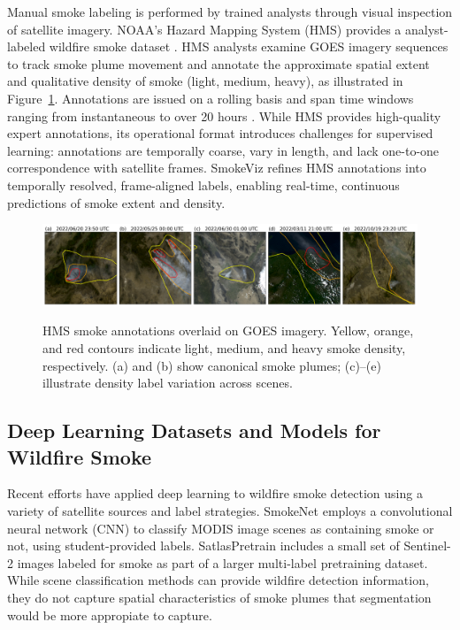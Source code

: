 \documentclass{article}
\begin{document}
Manual smoke labeling is performed by trained analysts through visual inspection of satellite imagery. NOAA’s Hazard Mapping System (HMS) provides a analyst-labeled wildfire smoke dataset \cite{hms, hms_val}. HMS analysts examine GOES imagery sequences to track smoke plume movement and annotate the approximate spatial extent and qualitative density of smoke (light, medium, heavy), as illustrated in Figure~\ref{densities}. Annotations are issued on a rolling basis and span time windows ranging from instantaneous to over 20 hours \cite{hms_web}. While HMS provides high-quality expert annotations, its operational format introduces challenges for supervised learning: annotations are temporally coarse, vary in length, and lack one-to-one correspondence with satellite frames. SmokeViz refines HMS annotations into temporally resolved, frame-aligned labels, enabling real-time, continuous predictions of smoke extent and density.

\begin{figure}[!htb]
    \centering
    \includegraphics[width=\linewidth]{figures/variations_small.png}\label{densities}
    \caption{HMS smoke annotations overlaid on GOES imagery. Yellow, orange, and red contours indicate light, medium, and heavy smoke density, respectively. (a) and (b) show canonical smoke plumes; (c)–(e) illustrate density label variation across scenes.}
\end{figure}

\subsection{Deep Learning Datasets and Models for Wildfire Smoke}

Recent efforts have applied deep learning to wildfire smoke detection using a variety of satellite sources and label strategies. SmokeNet \cite{smokenet} employs a convolutional neural network (CNN) to classify MODIS image scenes as containing smoke or not, using student-provided labels. SatlasPretrain \cite{satlas} includes a small set of Sentinel-2 images labeled for smoke as part of a larger multi-label pretraining dataset. While scene classification methods can provide wildfire detection information, they do not capture spatial characteristics of smoke plumes that segmentation would be more appropiate to capture.
\end{document}
